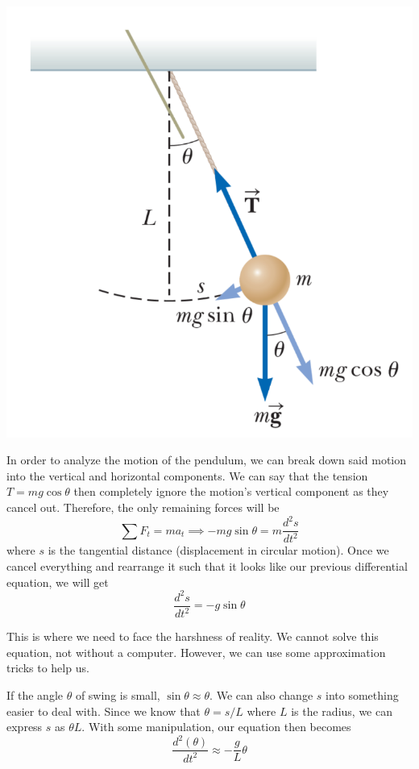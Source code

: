 \begin{center}
\includegraphics[scale=0.3]{images/oaw/pendulum01.png}
\end{center}

In order to analyze the motion of the pendulum, we can break down said motion into the vertical and
horizontal components. We can say that the tension $T = mg\cos\theta$ then completely ignore the motion's
vertical component as they cancel out. Therefore, the only remaining forces will be
\[\sum F_t = ma_t \implies -mg\sin\theta = m\frac{d^2s}{dt^2}\]
where $s$ is the tangential distance (displacement in circular motion). Once we cancel everything
and rearrange it such that it looks like our previous differential equation, we will get
\[ \frac{d^2s}{dt^2} = -g\sin\theta \]

This is where we need to face the harshness of reality. We cannot solve this equation, not without
a computer. However, we can use some approximation tricks to help us.

If the angle $\theta$ of swing is small, $\sin\theta \approx \theta$. We can also change $s$ into 
something easier to deal with. Since we know that $\theta = s/L$ where $L$ is the radius, we can
express $s$ as $\theta L$. With some manipulation, our equation then becomes
\[ \frac{d^2(\theta)}{dt^2} \approx -\frac{g}{L}\theta \]


